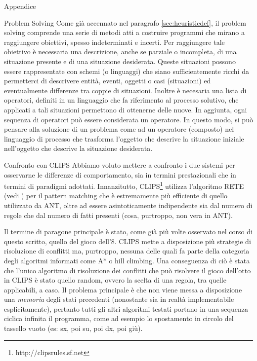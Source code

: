 \begin{chapter}{Appendice}
\begin{section}{Problem Solving}
\label{sec:problem-solving}
Come gi\`a accennato nel paragrafo \ref{sec:heuristicdef}, il problem
solving comprende una serie di metodi atti a costruire programmi che mirano a raggiungere
obiettivi, spesso indeterminati e incerti. Per raggiungere tale obiettivo \`e necessaria
una descrizione, anche se parziale o incompleta, di una situazione presente e di una
situazione desiderata. Queste situazioni possono essere rappresentate con schemi (o
linguaggi) che siano sufficientemente ricchi da permetterci di descrivere entit\`a,
eventi, oggetti o casi (situazioni) ed eventualmente differenze tra coppie di situazioni.
Inoltre \`e necesaria una lista di operatori, definiti in un linguaggio che fa riferimento
al processo solutivo, che applicati a tali situazioni permettono di ottenerne delle nuove.
In aggiunta, ogni sequenza di operatori pu\`o essere considerata un operatore. In questo
modo, si pu\`o pensare alla soluzione di un problema come ad un operatore (composto) nel
linguaggio di processo che trasforma l'oggetto che descrive la situazione iniziale
nell'oggetto che descrive la situazione desiderata.
\end{section}

\begin{section}{Confronto con CLIPS}
\label{sec:clips-comparison}
Abbiamo voluto mettere a confronto i due sistemi per osservarne le differenze di
comportamento, sia in termini prestazionali che in termini di paradigmi adottati.
Innanzitutto, CLIPS\footnote{http://clipsrules.sf.net} utilizza l'algoritmo RETE
(vedi \cite{rete}) per il pattern matching che \`e estremamente pi\`u efficiente
di quello utilizzato da ANT, oltre ad essere asintoticamente indipendente sia dal
numero di regole che dal numero di fatti presenti (cosa, purtroppo, non vera in ANT).

Il termine di paragone principale \`e stato, come gi\`a pi\`u volte osservato nel
corso di questo scritto, quello del gioco dell'8. CLIPS mette a disposizione pi\`u
strategie di risoluzione di conflitti ma, purtroppo, nessuna delle quali fa parte
della categoria degli algoritmi informati come A* o hill climbing. Una conseguenza
di ci\`o \`e stata che l'unico algoritmo di risoluzione dei conflitti che pu\`o
risolvere il gioco dell'otto in CLIPS \`e stato quello random, ovvero la scelta
di una regola, tra quelle applicabili, a caso. Il problema principale \`e che non
viene messa a disposizione una \textit{memoria} degli stati precedenti (nonostante
sia in realt\`a implementabile esplicitamente), pertanto tutti gli altri algoritmi
testati portano in una sequenza ciclica infinita il programma, come ad esempio lo
spostamento in circolo del tassello vuoto (es: sx, poi su, poi dx, poi gi\`u).


\end{section}
\end{chapter}
